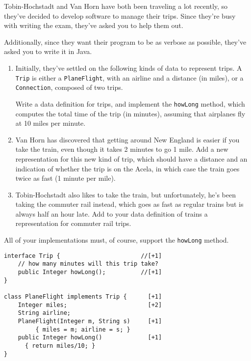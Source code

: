 \documentclass[12pt]{article}                   %
\def\pts#1{\marginpar{\footnotesize \raggedright  \fbox{#1 {\sc Points}}}}
\newenvironment{solution}{}{}
\begin{document}
\begin{problem}\pts{22}

Tobin-Hochstadt and Van Horn have both been traveling a lot recently,
so they've decided to develop software to manage their trips.  Since
they're busy with writing the exam, they've asked you to help them
out. 

Additionally, since they want their program to be as verbose as
possible, they've asked you to write it in Java.  

\begin{enumerate}
\item
Initially, they've settled on the following kinds of data to represent
trips.  A {\tt Trip} is either a {\tt PlaneFlight}, with an airline
and a distance (in miles), or a {\tt Connection}, composed of two trips.  

Write a data definition for trips, and implement the {\tt howLong}
method, which computes the total time of the trip (in minutes),
assuming that airplanes fly at 10 miles per minute.

\item
Van Horn has discovered that getting around New England is easier if
you take the train, even though it takes 2 minutes to go 1 mile.  Add a new representation for this new kind of
trip, which should have a distance and an indication of whether the trip
is on the Acela, in which case the train goes twice as fast (1 minute
per mile).

\item Tobin-Hochstadt also likes to take the train, but unfortunately,
  he's been taking the commuter rail instead, which goes as fast as
  regular trains but is always half an hour late.  Add to your data
  definition of trains a representation for commuter rail trips.  
\end{enumerate}

All of your implementations must, of course, support the {\tt howLong}
method.    

\newpage
\ifrubric{}
\newpage
\fi

\begin{solution}
\begin{verbatim}
interface Trip {                       //[+1]
    // how many minutes will this trip take? 
    public Integer howLong();          //[+1]
}

class PlaneFlight implements Trip {      [+1]
    Integer miles;                       [+2]
    String airline;
    PlaneFlight(Integer m, String s)     [+1]
         { miles = m; airline = s; }   
    public Integer howLong()             [+1]
      { return miles/10; }
}


\end{verbatim}
\end{solution}
\end{problem}
\end{document}
